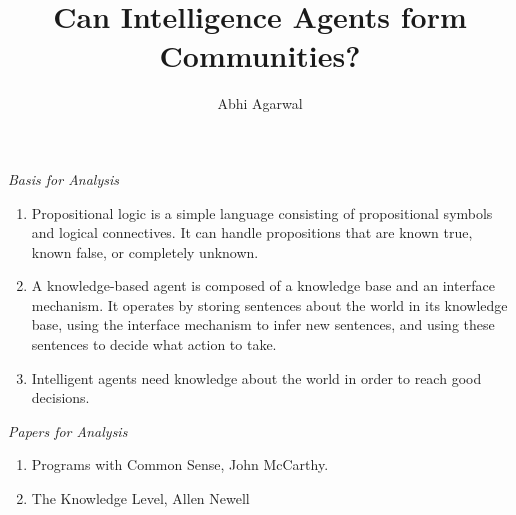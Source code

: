 \documentclass[12pt,leqno,oneside]{book}
\title{Can Intelligence Agents form Communities?}
\author{Abhi Agarwal}
\theoremstyle{plain}
\theoremstyle{definition}
\theoremstyle{remark}
\begin{document}
\maketitle
\frontmatter
\newpage

\mainmatter

\begin{center}
{\small\em Basis for Analysis}
\end{center}

\begin{enumerate}
\item Propositional logic is a simple language consisting of propositional symbols and logical connectives. It can handle propositions that are known true, known false, or completely unknown.
\item A knowledge-based agent is composed of a knowledge base and an interface mechanism. It operates by storing sentences about the world in its knowledge base, using the interface mechanism to infer new sentences, and using these sentences to decide what action to take.
\item Intelligent agents need knowledge about the world in order to reach good decisions.
\end{enumerate}

\begin{center}
{\small\em Papers for Analysis}
\end{center}

\begin{enumerate}
\item Programs with Common Sense, John McCarthy.
\item The Knowledge Level, Allen Newell
\end{enumerate}
\end{document}
